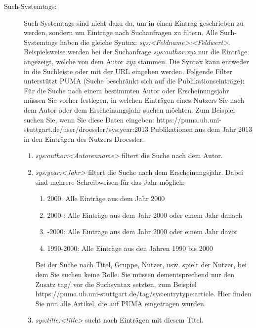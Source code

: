 \begin{description}
\begin{enumerate}
\end{enumerate}
\item[Such-Systemtags:] 
\label{itm:suchSystemtag}
Such-Systemtags sind nicht dazu da, um in einen Eintrag geschrieben zu werden, sondern um Einträge nach Suchanfragen zu filtern. Alle Such-Systemtags haben die gleiche Syntax: \textit{sys:<Feldname>:<Feldwert>}. Beispielsweise werden  bei der Suchanfrage \textit{sys:author:xyz} nur die Einträge angezeigt, welche von dem Autor \textit{xyz} stammen.\newline
Die Syntax kann entweder in die Suchleiste oder mit der URL eingeben werden. Folgende Filter unterstützt PUMA (Suche beschränkt sich auf die Publikationseinträge):\newline
\newline
Für die Suche nach einem bestimmten Autor oder Erscheinungsjahr müssen Sie vorher festlegen, in welchen Einträgen eines Nutzers Sie nach dem Autor oder dem Erscheinungsjahr suchen möchten. Zum Beispiel suchen Sie, wenn Sie diese Daten eingeben: \newline https://puma.ub.uni-stuttgart.de/user/\newline droessler/sys:year:2013 \newline Publikationen aus dem Jahr 2013 in den Einträgen des Nutzers Droessler. 
\begin{enumerate}
    \item \textit{sys:author:<Autorenname>} filtert die Suche nach dem Autor.
    \item \textit{sys:year:<Jahr>} filtert die Suche nach dem Erscheinungsjahr. Dabei sind mehrere Schreibweisen für das Jahr möglich:
    \begin{enumerate}
        \item 2000: Alle Einträge aus dem Jahr 2000
        \item 2000-: Alle Einträge aus dem Jahr 2000 oder einem Jahr danach
        \item -2000: Alle Einträge aus dem Jahr 2000 oder einem Jahr davor
        \item 1990-2000: Alle Einträge aus den Jahren 1990 bis 2000
    \end{enumerate}
Bei der Suche nach Titel, Gruppe, Nutzer, usw. spielt der Nutzer, bei dem Sie suchen keine Rolle. Sie müssen dementsprechend nur den Zusatz tag/ vor die Suchsyntax setzten, zum Beispiel  https://puma.ub.uni-stuttgart.de/tag/sys:entrytype:article. Hier finden Sie nun alle Artikel, die auf PUMA eingetragen wurden.
    \item \textit{sys:title:<title>} sucht nach Einträgen mit diesem Titel.

\end{enumerate}
\end{description}
